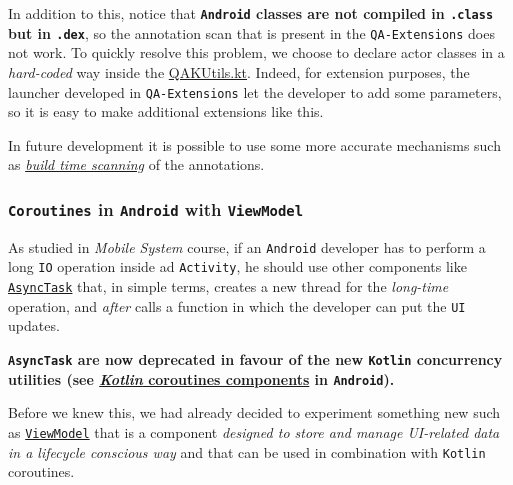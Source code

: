 In addition to this, notice that \textbf{\texttt{Android} classes are not compiled in \texttt{.class} but in \texttt{.dex}}, so the annotation scan that is present in the \texttt{QA-Extensions} does not work. To quickly resolve this problem, we choose to declare actor classes in a \textit{hard-coded} way inside the \href{https://github.com/LucaLand/MobileSystemsProject-LL/blob/0.9.1/app/src/main/java/it/unibo/mobilesystems/actors/QAKUtils.kt}{QAKUtils.kt}. Indeed, for extension purposes, the launcher developed in \texttt{QA-Extensions} let the developer to add some parameters, so it is easy to make additional extensions like this.

In future development it is possible to use some more accurate mechanisms such as \href{https://github.com/classgraph/classgraph/wiki/Build-Time-Scanning}{\textit{build time scanning}} of the annotations. 

\subsubsection{\texttt{Coroutines} in \texttt{Android} with \texttt{ViewModel}}

As studied in \textit{Mobile System} course, if an \texttt{Android} developer has to perform a long \texttt{IO} operation inside ad \texttt{Activity}, he should use other components like \href{https://developer.android.com/reference/android/os/AsyncTask}{\texttt{AsyncTask}} that, in simple terms, creates a new thread for the \textit{long-time} operation, and \textit{after} calls a function in which the developer can put the \texttt{UI} updates.

\begin{tcolorbox}[colback=red!5!white,colframe=red!75!black]
	\begin{center}
		\textbf{\texttt{AsyncTask} are now deprecated in favour of the new \texttt{Kotlin} concurrency utilities (see \href{https://developer.android.com/topic/libraries/architecture/coroutines}{\textit{Kotlin} coroutines components} in \texttt{Android}).}
	\end{center}
\end{tcolorbox}

Before we knew this, we had already decided to experiment something new such as \href{https://developer.android.com/topic/libraries/architecture/viewmodel}{\texttt{ViewModel}} that is a component \textit{designed to store and manage UI-related data in a lifecycle conscious way} and that can be used in combination with \texttt{Kotlin} coroutines.

